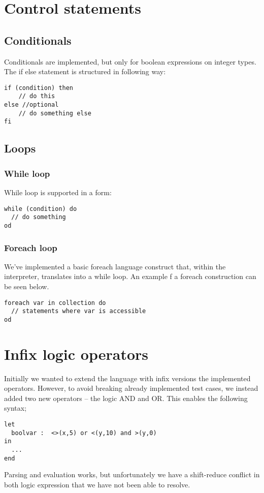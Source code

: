 \documentclass[10pt]{scrartcl}
\begin{document}
\section{Control statements}
\subsection{Conditionals}
Conditionals are implemented, but only for boolean expressions on integer types. The if else statement is structured in following way:
 \begin{lstlisting}
if (condition) then
	// do this
else //optional
	// do something else
fi
\end{lstlisting}
\subsection{Loops}
\subsubsection{While loop}
While loop is supported in a form:
 \begin{lstlisting}
while (condition) do
  // do something
od
\end{lstlisting}
\subsubsection{Foreach loop}
We've implemented a basic foreach language construct that, within the interpreter, translates into a while loop. An example f a foreach construction can be seen below.
  \begin{lstlisting}
foreach var in collection do
  // statements where var is accessible
od
\end{lstlisting}
\section{Infix logic operators}
Initially we wanted to extend the language with infix versions the implemented operators. However, to avoid breaking already implemented test cases, we instead added two new operators -- the logic AND and OR. This enables the following syntax;
\begin{lstlisting}
let
  boolvar :  <>(x,5) or <(y,10) and >(y,0)
in
  ...
end
\end{lstlisting}
Parsing and evaluation works, but unfortunately we have a shift-reduce conflict in both logic expression that we have not been able to resolve.
\end{document}
